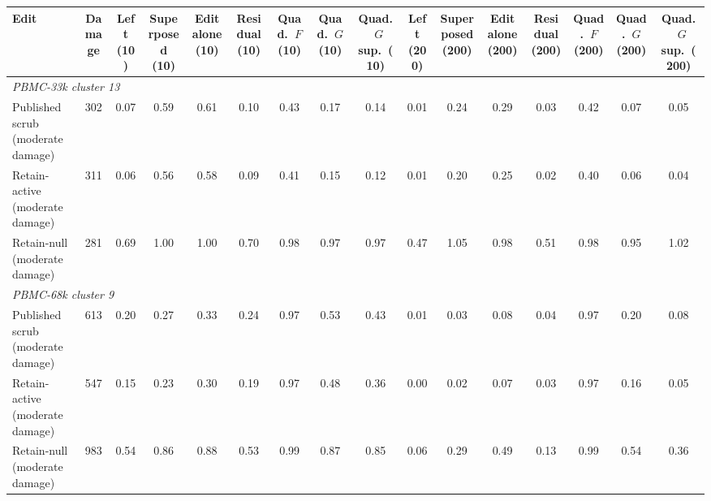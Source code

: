 \begin{tabular}{lccccccccccccccc}
\toprule
Edit & Damage & Left (10) & Superposed (10) & Edit alone (10) & Residual (10) & Quad.\ $F$ (10) & Quad.\ $G$ (10) & Quad.\ $G$ sup.\ (10) & Left (200) & Superposed (200) & Edit alone (200) & Residual (200) & Quad.\ $F$ (200) & Quad.\ $G$ (200) & Quad.\ $G$ sup.\ (200) \\
\midrule
\multicolumn{16}{l}{\emph{PBMC-33k cluster 13}} \\
Published scrub (moderate damage) & 302 & 0.07 & 0.59 & 0.61 & 0.10 & 0.43 & 0.17 & 0.14 & 0.01 & 0.24 & 0.29 & 0.03 & 0.42 & 0.07 & 0.05 \\
Retain-active (moderate damage) & 311 & 0.06 & 0.56 & 0.58 & 0.09 & 0.41 & 0.15 & 0.12 & 0.01 & 0.20 & 0.25 & 0.02 & 0.40 & 0.06 & 0.04 \\
Retain-null (moderate damage) & 281 & 0.69 & 1.00 & 1.00 & 0.70 & 0.98 & 0.97 & 0.97 & 0.47 & 1.05 & 0.98 & 0.51 & 0.98 & 0.95 & 1.02 \\
\midrule
\multicolumn{16}{l}{\emph{PBMC-68k cluster 9}} \\
Published scrub (moderate damage) & 613 & 0.20 & 0.27 & 0.33 & 0.24 & 0.97 & 0.53 & 0.43 & 0.01 & 0.03 & 0.08 & 0.04 & 0.97 & 0.20 & 0.08 \\
Retain-active (moderate damage) & 547 & 0.15 & 0.23 & 0.30 & 0.19 & 0.97 & 0.48 & 0.36 & 0.00 & 0.02 & 0.07 & 0.03 & 0.97 & 0.16 & 0.05 \\
Retain-null (moderate damage) & 983 & 0.54 & 0.86 & 0.88 & 0.53 & 0.99 & 0.87 & 0.85 & 0.06 & 0.29 & 0.49 & 0.13 & 0.99 & 0.54 & 0.36 \\
\bottomrule
\end{tabular}
